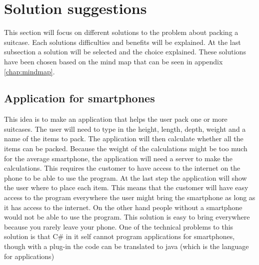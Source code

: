 \section{Solution suggestions} 	
This section will focus on different solutions to the problem about packing a suitcase. Each solutions difficulties and benefits will be explained. At the last subsection a solution will be selected and the choice explained. These solutions have been chosen based on the mind map that can be seen in appendix  \ref{chap:mindmap}.

\subsection{Application for smartphones}
This idea is to make an application that helps the user pack one or more suitcases. The user will need to type in the height, length, depth, weight and a name of the items to pack. The application will then calculate whether all the items can be packed. Because the weight of the calculations might be too much for the average smartphone, the application will need a server to make the calculations. This requires the customer to have access to the internet on the phone to be able to use the program. At the last step the application will show the user where to place each item. This means that the customer will have easy access to the program everywhere the user might bring the smartphone as long as it has access to the internet. On the other hand people without a smartphone would not be able to use the program. This solution is easy to bring everywhere because you rarely leave your phone. One of the technical problems to this solution is that C# in it self cannot program applications for smartphones, though with a plug-in the code can be translated to java (which is the language for applications)

